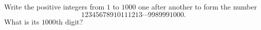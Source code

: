 Write the positive integers from $1$ to $1000$ one after another to form the number
\[
12345678910111213\cdots9989991000 .
\]
What is its $1000$th digit?
